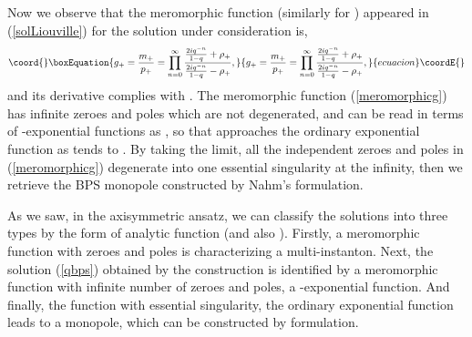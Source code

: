 \documentclass[a4paper,10pt]{article}
\begin{document}
Now we observe that the meromorphic function \coordHE{} (similarly for \coordHE{}) appeared in (\ref{solLiouville}) for the  solution under consideration is,
\begin{equation}\coord{}\boxEquation{
g_+=\frac{m_+}{p_+}=\prod_{n=0}^\infty\frac{\frac{2iq^{-n}}{1-q}+\rho_+}{\frac{2iq^{-n}}{1-q}-\rho_+},\label{meromorphicg}
}{
g_+=\frac{m_+}{p_+}=\prod_{n=0}^\infty\frac{\frac{2iq^{-n}}{1-q}+\rho_+}{\frac{2iq^{-n}}{1-q}-\rho_+},}{ecuacion}\coordE{}\end{equation}
and its derivative complies with \coordHE{}.
The meromorphic function (\ref{meromorphicg}) has infinite zeroes and poles which are not degenerated, and can be read in terms of \coordHE{}-exponential functions as \coordHE{}, so that approaches the ordinary exponential function \coordHE{} as \coordHE{} tends to \coordHE{}.
By taking the limit, all the independent zeroes and poles in (\ref{meromorphicg}) degenerate into one essential singularity at the infinity, then we retrieve the BPS monopole constructed by Nahm's \coordHE{} formulation.


As we saw, in the axisymmetric ansatz, we can classify the solutions into three types by the form of analytic function \coordHE{} (and also \coordHE{}).
Firstly, a meromorphic function with \coordHE{} zeroes and poles is characterizing a multi-instanton.
Next, the solution (\ref{qbps}) obtained by the \coordHE{} construction is identified by a meromorphic function with infinite number of zeroes and poles, a \coordHE{}-exponential function.
And finally, the function with essential singularity, the ordinary exponential function leads to a monopole, which can be constructed by \coordHE{} formulation.



\end{document}
